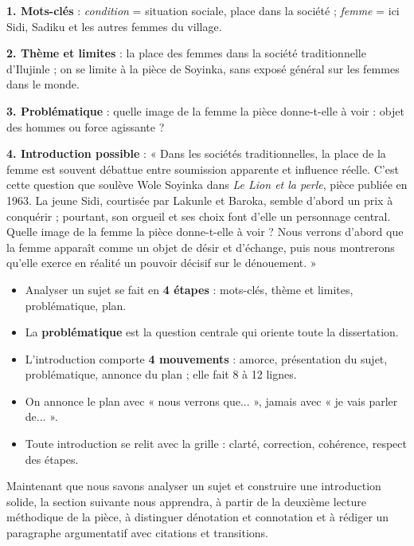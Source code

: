 \documentclass[11pt]{article}
\begin{document}
\begin{corrige}
\textbf{1. Mots-clés} : \emph{condition} = situation sociale, place dans la société ; \emph{femme} = ici Sidi, Sadiku et les autres femmes du village.\par
\textbf{2. Thème et limites} : la place des femmes dans la société traditionnelle d'Ilujinle ; on se limite à la pièce de Soyinka, sans exposé général sur les femmes dans le monde.\par
\textbf{3. Problématique} : quelle image de la femme la pièce donne-t-elle à voir : objet des hommes ou force agissante ?\par
\textbf{4. Introduction possible} : « Dans les sociétés traditionnelles, la place de la femme est souvent débattue entre soumission apparente et influence réelle. C'est cette question que soulève Wole Soyinka dans \emph{Le Lion et la perle}, pièce publiée en 1963. La jeune Sidi, courtisée par Lakunle et Baroka, semble d'abord un prix à conquérir ; pourtant, son orgueil et ses choix font d'elle un personnage central. Quelle image de la femme la pièce donne-t-elle à voir ? Nous verrons d'abord que la femme apparaît comme un objet de désir et d'échange, puis nous montrerons qu'elle exerce en réalité un pouvoir décisif sur le dénouement. »
\end{corrige}

\begin{aretenir}
\begin{itemize}
\item Analyser un sujet se fait en \textbf{4 étapes} : mots-clés, thème et limites, problématique, plan.
\item La \textbf{problématique} est la question centrale qui oriente toute la dissertation.
\item L'introduction comporte \textbf{4 mouvements} : amorce, présentation du sujet, problématique, annonce du plan ; elle fait 8 à 12 lignes.
\item On annonce le plan avec « nous verrons que... », jamais avec « je vais parler de... ».
\item Toute introduction se relit avec la grille : clarté, correction, cohérence, respect des étapes.
\end{itemize}
\end{aretenir}

Maintenant que nous savons analyser un sujet et construire une introduction solide, la section suivante nous apprendra, à partir de la deuxième lecture méthodique de la pièce, à distinguer dénotation et connotation et à rédiger un paragraphe argumentatif avec citations et transitions.
\end{document}
